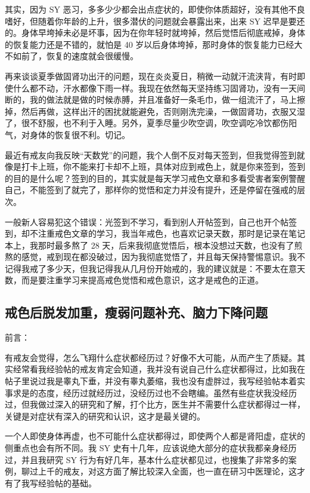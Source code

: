 \documentclass[fontset=founder]{ctexart}
\begin{document}
其实，因为 SY 恶习，多多少少都会出点症状的，即使你体质超好，没有其他不良嗜好，但随着你年龄的上升，很多潜伏的问题就会暴露出来，出来 SY 迟早是要还的。身体早垮掉未必是坏事，因为在你年轻时就垮掉，然后觉悟后彻底戒掉，身体的恢复能力还是不错的，就怕是 40 岁以后身体垮掉，那时身体的恢复能力已经大不如前了，恢复的速度就会很缓慢。

再来谈谈夏季做固肾功出汗的问题，现在炎炎夏日，稍微一动就汗流浃背，有时即使什么都不动，汗水都像下雨一样。我现在依然每天坚持练习固肾功，没有一天间断的，我的做法就是做的时候赤膊，并且准备好一条毛巾，做一组流汗了，马上擦掉，然后再做，这样出汗的困扰就能避免，否则刚洗完澡，一做固肾功，衣服又湿了，很不舒服，也不利于入睡。另外，夏季尽量少吹空调，吹空调吃冷饮都伤阳气，对身体的恢复很不利。切记。

最近有戒友向我反映“天数党”的问题，我个人倒不反对每天签到，但我觉得签到就像是打卡上班，你不能来打卡却不上班，具体对应到戒色上，就是你来签到，签到的目的是什么呢？签到的目的，其实就是每天学习戒色文章和多看受害者案例警醒自己，不能签到了就完了，那样你的觉悟和定力并没有提升，还是停留在强戒的层次。

一般新人容易犯这个错误：光签到不学习，看到别人开帖签到，自己也开个帖签到，却不注重戒色文章的学习，我当年戒色，也喜欢记录天数，那时是记录在笔记本上，我那时最多熬了 28 天，后来我彻底觉悟后，根本没想过天数，也没有了煎熬的感觉，戒到现在都没破过，因为我彻底觉悟了，并且每天保持警惕意识。我不记得我戒了多少天，但我记得我从几月份开始戒的，我的建议就是：不要太在意天数，而是要注重学习来提高戒色觉悟和戒色意识，这才是戒色的正道。

\subsection{戒色后脱发加重，瘦弱问题补充、脑力下降问题}

前言：

有戒友会觉得，怎么飞翔什么症状都经历过？好像不大可能，从而产生了质疑。其实经常看我经验帖的戒友肯定会知道，我并没有说自己什么症状都得过，比如我在帖子里说过我是睾丸下垂，并没有睾丸萎缩，我也没有虚胖过，我写经验帖本着实事求是的态度，经历过就经历过，没经历过也不会瞎编。虽然有些症状我没经历过，但我做过深入的研究和了解，打个比方，医生并不需要什么症状都得过一样，关键是对症状有深入的研究和认识，这才是最关键的。

一个人即使身体再虚，也不可能什么症状都得过，即使两个人都是肾阳虚，症状的侧重点也会有所不同。我 SY 史有十几年，应该说绝大部分的症状我都亲身经历过，并且我研究 SY 行为有好几年，基本什么症状都见过，也搜集了非常多的案例，聊过上千的戒友，对这方面了解比较深入全面，也一直在研习中医理论，这才有了我写经验帖的基础。
\end{document}
